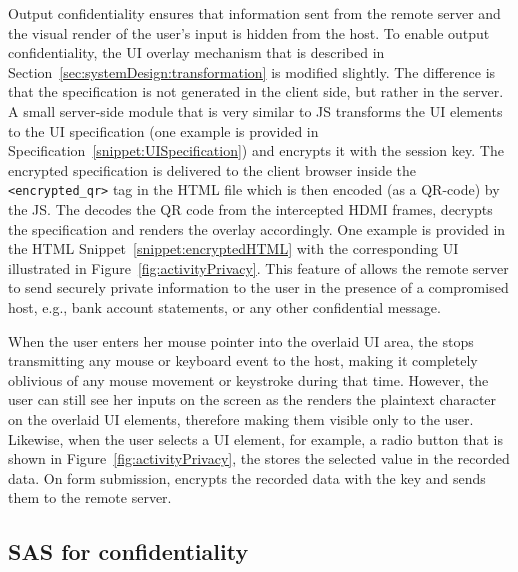  Output confidentiality ensures that information sent from the remote server and the visual render of the user's input is hidden from the host. To enable output confidentiality, the UI overlay mechanism that is described in Section~\ref{sec:systemDesign:transformation} is modified slightly. The difference is that the specification is not generated in the client side, but rather in the server.
A small server-side module that is very similar to \name JS transforms the UI elements to the UI specification (one example is provided in Specification~\ref{snippet:UISpecification}) and encrypts it with the \tls session key. 
The encrypted specification is delivered to the client browser inside the \texttt{<encrypted\_qr>} tag in the HTML file which is then encoded (as a QR-code) by the \name JS. The \device decodes the QR code from the intercepted HDMI frames, decrypts the specification and renders the overlay accordingly. One example is provided in the HTML Snippet~\ref{snippet:encryptedHTML} with the corresponding UI illustrated in Figure~\ref{fig:activityPrivacy}. 
This feature of \name allows the remote server to send securely private information to the user in the presence of a compromised host, e.g., bank account statements, or any other confidential message. 

 When the user enters her mouse pointer into the overlaid UI area, the \device stops transmitting any mouse or keyboard event to the host, making it completely oblivious of any mouse movement or keystroke during that time. 
However, the user can still see her inputs on the screen as the \device renders the plaintext character on the overlaid UI elements, therefore making them visible only to the user.
Likewise, when the user selects a UI element, for example, a radio button that is shown in Figure~\ref{fig:activityPrivacy}, the \device stores the selected value in the recorded data.
On form submission, \device encrypts the recorded data with the \tls key and sends them to the remote server.

\subsection{SAS for confidentiality} 
\label{sec:confidentiality:SAS}


